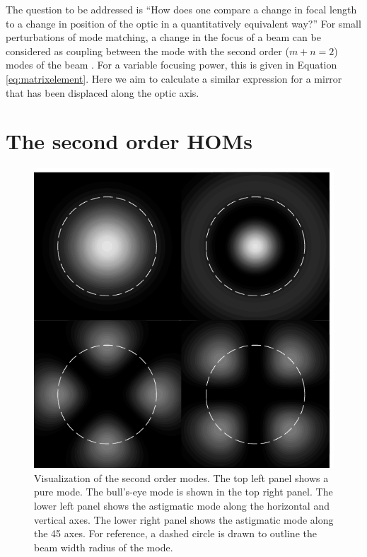 The question to be addressed is ``How does one compare a change in focal length to a change in position of the optic in a quantitatively equivalent way?'' %
For small perturbations of mode matching, a change in the focus of a beam can be considered as coupling between the  mode with the second order ($m+n=2$) modes of the beam \cite{Anderson1984}. %
For a variable focusing power, this is given in Equation \ref{eq:matrixelement}. %
Here we aim to calculate a similar expression for a mirror  that has been displaced along the optic axis.

\section{The second order HOMs}
\label{sec:secondordermodes}

\begin{figure}[h!]
  \begin{center}
  \leavevmode
  \includegraphics{figs-ap-notes/puresecondordermodes.pdf}
  \end{center}
  \caption[Visualization of the second order modes.]{Visualization of the second order modes. The top left panel shows a pure  mode. The bull's-eye mode is shown in the top right panel. The lower left panel shows the astigmatic mode along the horizontal and vertical axes. The lower right panel shows the astigmatic mode along the 45\degrees{} axes. For reference, a dashed circle is drawn to outline the beam width radius of the  mode.}
  \label{fig:puresecondordermodes}
\end{figure}

